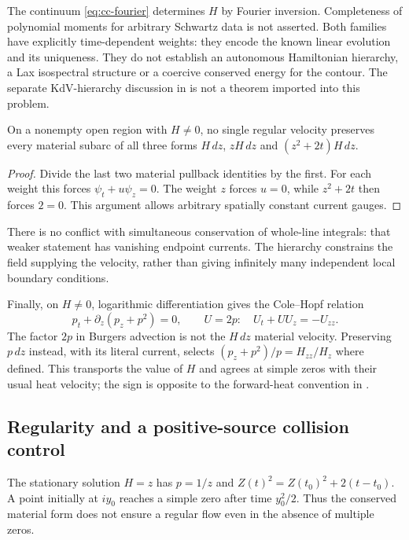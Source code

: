 The continuum \eqref{eq:cc-fourier} determines $H$ by Fourier inversion.
Completeness of polynomial moments for arbitrary Schwartz data is not
asserted.  Both families have explicitly time-dependent weights:
they encode the known linear evolution and its uniqueness.  They do
not establish an autonomous Hamiltonian hierarchy, a Lax isospectral
structure or a coercive conserved energy for the contour.  The separate
KdV-hierarchy discussion in \cite{ibragimov2006} is not a theorem
imported into this problem.

\begin{proposition}
\label{prop:cc-no-common-velocity}
On a nonempty open region with $H\ne0$, no single regular velocity
preserves every material subarc of all three forms
$H\,dz$, $zH\,dz$ and $(z^2+2t)H\,dz$.
\end{proposition}
\begin{proof}
Divide the last two material pullback identities by the first.
For each weight this forces $\psi_t+u\psi_z=0$.
The weight $z$ forces $u=0$, while $z^2+2t$ then forces $2=0$.
This argument allows arbitrary spatially constant current gauges.
\end{proof}
There is no conflict with simultaneous conservation of whole-line
integrals: that weaker statement has vanishing endpoint currents.
The hierarchy constrains the field supplying the velocity, rather than
giving infinitely many independent local boundary conditions.

Finally, on $H\ne0$, logarithmic differentiation gives the
Cole--Hopf relation \cite{cole,hopf}
\begin{equation}
 p_t+\partial_z(p_z+p^2)=0,
 \qquad U=2p:\quad U_t+UU_z=-U_{zz}.
 \label{eq:cc-burgers}
\end{equation}
The factor $2p$ in Burgers advection is not the $H\,dz$ material
velocity.  Preserving $p\,dz$ instead, with its literal current,
selects $(p_z+p^2)/p=H_{zz}/H_z$ where defined.  This transports the
value of $H$ and agrees at simple zeros with their usual heat velocity;
the sign is opposite to the forward-heat convention in
\cite{papanicolaou}.

\subsection{Regularity and a positive-source collision control}

The stationary solution $H=z$ has $p=1/z$ and
$Z(t)^2=Z(t_0)^2+2(t-t_0)$.  A point initially at $iy_0$ reaches a
simple zero after time $y_0^2/2$.  Thus the conserved material form does
not ensure a regular flow even in the absence of multiple zeros.

